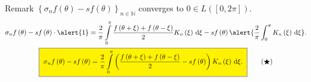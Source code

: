 \begin{frame}
\begin{block}{Remark}
\begin{math}
			{
				\left\{
				\sigma_{n}f\left(\theta\right)-
				sf\left(\theta\right)
				\right\}
			}_{n\in\mathds{N}}
		\end{math}
		converges to $0\in L\left(\left[0,2\pi\right]\right)$.
		\begin{gather}
			\sigma_{n}f\left(\theta\right)-
			sf\left(\theta\right)\cdot\alert{1}=
			\frac{2}{\pi}
			\int\limits_{0}^{\pi}
			\frac{
				f\left(\theta+\xi\right)+
				f\left(\theta-\xi\right)
			}{2}
			K_{n}\left(\xi\right)
			\dl\xi
			-
			sf\left(\theta\right)
			\alert{
				\frac{2}{\pi}
				\int_{0}^{\pi}
				K_{n}\left(\xi\right)
				\dl\xi
			}.\notag                                \\
			\fcolorbox{DarkBlue}{yellow}{
				\begin{math}
					\displaystyle
					\sigma_{n}f\left(\theta\right)-
					sf\left(\theta\right)
					=
					\frac{2}{\pi}
					\int\limits_{0}^{\pi}
					\left(
					\frac{
							f\left(\theta+\xi\right)+
							f\left(\theta-\xi\right)
						}{2}-sf\left(\theta\right)
					\right)
					K_{n}\left(\xi\right)
					\dl\xi.
				\end{math}
			}\label{eq:mean-difference}\tag{$\bigstar$}
		\end{gather}
	\end{block}
\end{frame}